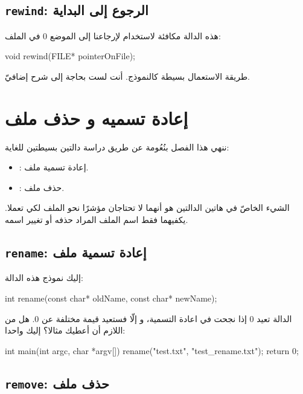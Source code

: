 \subsection{\texttt{rewind}: الرجوع إلى البداية}

هذه الدالة مكافئة لاستخدام
لإرجاعنا إلى الموضع 0 في الملف:

\begin{Csource}
void rewind(FILE* pointerOnFile);
\end{Csource}

طريقة الاستعمال بسيطة كالنموذج. أنت لست بحاجة إلى شرح إضافيّ.

\section{إعادة تسميه و حذف ملف}

ننهي هذا الفصل بنُعُومة عن طريق دراسة دالتين بسيطتين للغاية:

\begin{itemize}
  \item {}:
  إعادة تسمية ملف.
  \item {}:
  حذف ملف.
\end{itemize}

الشيء الخاصّ في هاتين الدالتين هو أنهما لا تحتاجان مؤشرًا نحو الملف لكي تعملا. يكفيهما فقط اسم الملف المراد حذفه أو تغيير اسمه.

\subsection{\texttt{rename}: إعادة تسمية ملف}

إليك نموذج هذه الدالة:

\begin{Csource}
int rename(const char* oldName, const char* newName);
\end{Csource}

الدالة تعيد 0 إذا نجحت في اعادة التسمية،  و إلّا فستعيد قيمة مختلفة عن 0. هل من اللازم أن أعطيك مثالا؟ إليك واحدا:

\begin{Csource}
int main(int argc, char *argv[])
{
    rename("test.txt", "test_rename.txt");
    return 0;
}
\end{Csource}

\subsection{\texttt{remove}: حذف ملف}

